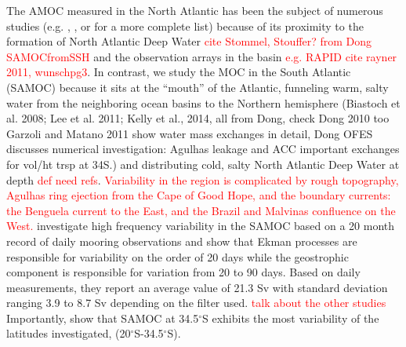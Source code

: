 \documentclass[a4paper,11pt]{article}
\newcommand{\red}[1]{\textcolor{red}{#1}}
\begin{document}
	The AMOC measured in the North Atlantic has been the subject of numerous studies (e.g. \cite{mccarthyAmoc}, \cite{pillarAttribution}, or \cite{lozier} for a more complete list) because of its proximity to the formation of North Atlantic Deep Water \red{cite Stommel, Stouffer? from Dong SAMOCfromSSH} and the observation arrays in the basin \red{e.g. RAPID cite rayner 2011, wunschpg3}. In contrast, we study the MOC in the South Atlantic (SAMOC) because it sits at the ``mouth'' of the Atlantic, funneling warm, salty water from the neighboring ocean basins to the Northern hemisphere (Biastoch et al. 2008; Lee et al. 2011; Kelly et al., 2014, all from Dong, check Dong 2010 too Garzoli and Matano 2011 show water mass exchanges in detail, Dong OFES discusses numerical investigation: Agulhas leakage and ACC important exchanges for vol/ht trsp at 34S.) and distributing cold, salty North Atlantic Deep Water at depth \red{def need refs}. \red{Variability in the region is complicated by rough topography, Agulhas ring ejection from the Cape of Good Hope, and the boundary currents: the Benguela current to the East, and the Brazil and Malvinas confluence on the West.} \cite{meinenSamoc} investigate high frequency variability in the SAMOC based on a 20 month record of daily mooring observations and show that Ekman processes are responsible for variability on the order of 20 days while the geostrophic component is responsible for variation from 20 to 90 days. Based on daily measurements, they report an average value of 21.3 Sv with standard deviation ranging 3.9 to 8.7 Sv depending on the filter used. \red{talk about the other studies} Importantly, \cite{dong20to35} show that SAMOC at 34.5$^{\circ}$S exhibits the most variability of the latitudes investigated, (20$^{\circ}$S-34.5$^{\circ}$S).
\end{document}
